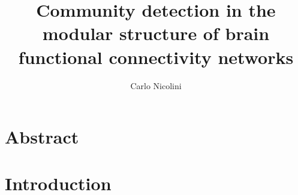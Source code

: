 
%

\title{Community detection in the modular structure of brain functional connectivity networks}
\author{Carlo Nicolini}

\newtheorem{obs}{Observation}
\newtheorem{props}{Proposition}
\newenvironment{bottompar}{\par\vspace*{\fill}}{\clearpage}


%

\maketitle
{}

\tableofcontents
\listoftodos

%

%

%


\chapter*{Abstract}


\chapter{Introduction}\label{chap:introduction}


%

